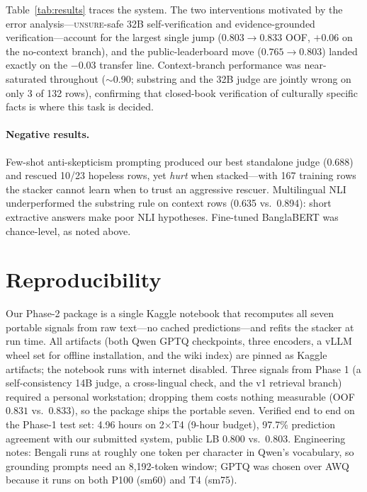 \documentclass[11pt]{article}
\begin{document}
Table~\ref{tab:results} traces the system. The two interventions motivated by
the error analysis---\textsc{unsure}-safe 32B self-verification and
evidence-grounded verification---account for the largest single jump
($0.803 \rightarrow 0.833$ OOF, $+0.06$ on the no-context branch), and the
public-leaderboard move ($0.765 \rightarrow 0.803$) landed exactly on the
$-0.03$ transfer line. Context-branch performance was near-saturated
throughout ($\sim$0.90; substring and the 32B judge are jointly wrong on only
3 of 132 rows), confirming that closed-book verification of culturally
specific facts is where this task is decided.

\paragraph{Negative results.} Few-shot anti-skepticism prompting produced our
best standalone judge (0.688) and rescued 10/23 hopeless rows, yet
\emph{hurt} when stacked---with 167 training rows the stacker cannot learn
when to trust an aggressive rescuer. Multilingual NLI underperformed the
substring rule on context rows (0.635 vs.\ 0.894): short extractive answers
make poor NLI hypotheses. Fine-tuned BanglaBERT was chance-level, as noted
above.

\section{Reproducibility}
\label{sec:repro}

Our Phase-2 package is a single Kaggle notebook that recomputes all seven
portable signals from raw text---no cached predictions---and refits the
stacker at run time. All artifacts (both Qwen GPTQ checkpoints, three
encoders, a vLLM wheel set for offline installation, and the wiki index) are
pinned as Kaggle artifacts; the notebook runs with internet disabled. Three
signals from Phase 1 (a self-consistency 14B judge, a cross-lingual check,
and the v1 retrieval branch) required a personal workstation; dropping them
costs nothing measurable (OOF $0.831$ vs.\ $0.833$), so the package ships
the portable seven. Verified end to end on the Phase-1 test set: 4.96 hours
on 2$\times$T4 (9-hour budget), 97.7\% prediction agreement with our
submitted system, public LB 0.800 vs.\ 0.803. Engineering notes: Bengali runs
at roughly one token per character in Qwen's vocabulary, so grounding prompts
need an 8{,}192-token window; GPTQ was chosen over AWQ because it runs on
both P100 (sm60) and T4 (sm75).
\end{document}

